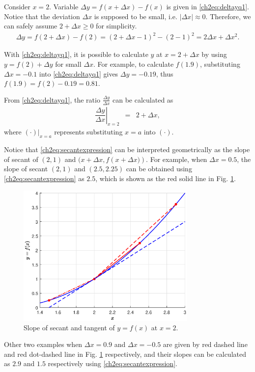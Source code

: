 Consider $x=2$. Variable $\Delta y = f\left(x+\Delta x\right) - f(x)$ is given in \eqref{ch2eq:deltayq1}. Notice that the deviation $\Delta x$ is supposed to be small, i.e. $|\Delta x| \approx 0$. Therefore, we can safely assume $2 + \Delta x \geq 0$ for simplicity.
\begin{eqnarray}
  \Delta y = f\left(2+\Delta x\right) - f(2)
  = \left(2 + \Delta x - 1\right)^2 - (2 - 1)^2
  = 2\Delta x + \Delta x^2. \label{ch2eq:deltayq1}
\end{eqnarray}

With \eqref{ch2eq:deltayq1}, it is possible to calculate $y$ at $x = 2 + \Delta x$ by using $y = f(2) + \Delta y$ for small $\Delta x$. For example, to calculate $f(1.9)$, substituting $\Delta x = -0.1$ into \eqref{ch2eq:deltayq1} gives $\Delta y = -0.19$, thus $f(1.9) = f(2) - 0.19 = 0.81$.

From \eqref{ch2eq:deltayq1}, the ratio $\frac{\Delta y}{\Delta x}$ can be calculated as
\begin{eqnarray}
  \left.\dfrac{\Delta y}{\Delta x}\right|_{x=2} &=& 2 + \Delta x, \label{ch2eq:secantexpression}
\end{eqnarray}
where $(\cdot)|_{x=a}$ represents substituting $x=a$ into $(\cdot)$.

Notice that \eqref{ch2eq:secantexpression} can be interpreted geometrically as the slope of secant of $(2,1)$ and $(x+\Delta x, f\left(x+\Delta x)\right)$. For example, when $\Delta x = 0.5$, the slope of secant $(2,1)$ and $(2.5,2.25)$ can be obtained using \eqref{ch2eq:secantexpression} as $2.5$, which is shown as the red solid line in Fig. \ref{ch2fig:simpleexptangent}.
\begin{figure}
\centering
\includegraphics[width=250pt]{chapters/chapter2/figures/fig_simpleexp_tangent.eps}
\caption{Slope of secant and tangent of $y=f(x)$ at $x=2$.} \label{ch2fig:simpleexptangent}
\end{figure}
Other two examples when $\Delta x= 0.9$ and $\Delta x = -0.5$ are given by red dashed line and red dot-dashed line in Fig. \ref{ch2fig:simpleexptangent} respectively, and their slopes can be calculated as $2.9$ and $1.5$ respectively using \eqref{ch2eq:secantexpression}.

